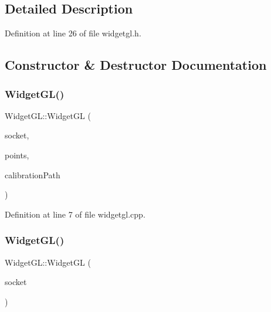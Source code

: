 \subsection{Detailed Description}


Definition at line 26 of file widgetgl.\+h.



\subsection{Constructor \& Destructor Documentation}
\mbox{\label{class_widget_g_l_ae93526bfd298a85a324d33d839fcacdb}} 
\subsubsection{\texorpdfstring{WidgetGL()}{WidgetGL()}\hspace{0.1cm}{\footnotesize\ttfamily [1/2]}}
{\footnotesize\ttfamily Widget\+G\+L\+::\+Widget\+GL (\begin{DoxyParamCaption}\item[{\mbox{\hyperlink{class_socket_viewer_widget}{Socket\+Viewer\+Widget}} $\ast$}]{socket,  }\item[{vector$<$ vector$<$ \mbox{\hyperlink{struct_vector3d}{Vector3d}} $\ast$ $>$$>$ $\ast$}]{points,  }\item[{Q\+String}]{calibration\+Path }\end{DoxyParamCaption})}



Definition at line 7 of file widgetgl.\+cpp.

\mbox{\label{class_widget_g_l_a5940219606b81201d139b69149494529}} 
\subsubsection{\texorpdfstring{WidgetGL()}{WidgetGL()}\hspace{0.1cm}{\footnotesize\ttfamily [2/2]}}
{\footnotesize\ttfamily Widget\+G\+L\+::\+Widget\+GL (\begin{DoxyParamCaption}\item[{\mbox{\hyperlink{class_socket_viewer_widget}{Socket\+Viewer\+Widget}} $\ast$}]{socket }\end{DoxyParamCaption})}



